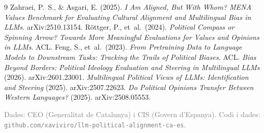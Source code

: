 \documentclass[10pt,twocolumn]{article}
\begin{document}
\begin{thebibliography}{9}
\small
{} Zahraei, P.~S., \& Asgari, E. (2025). \emph{I Am Aligned, But
With Whom? MENA Values Benchmark for Evaluating Cultural Alignment and Multilingual
Bias in LLMs}. arXiv:2510.13154.
 R\"ottger, P., et~al.\ (2024). \emph{Political Compass or Spinning
Arrow? Towards More Meaningful Evaluations for Values and Opinions in LLMs}. ACL.
 Feng, S., et~al.\ (2023). \emph{From Pretraining Data to Language
Models to Downstream Tasks: Tracking the Trails of Political Biases}. ACL.
 \emph{Bias Beyond Borders: Political Ideology Evaluation and
Steering in Multilingual LLMs} (2026). arXiv:2601.23001.
 \emph{Multilingual Political Views of LLMs: Identification and
Steering} (2025). arXiv:2507.22623.
 \emph{Do Political Opinions Transfer Between Western Languages?}
(2025). arXiv:2508.05553.
\end{thebibliography}

\vspace{1.2em}
\noindent\footnotesize\textcolor{gray}{Dades: CEO (Generalitat de Catalunya) i CIS
(Govern d'Espanya). Codi i dades: \texttt{github.com/xaviviro/llm-political-alignment-ca-es}.}
\end{document}
